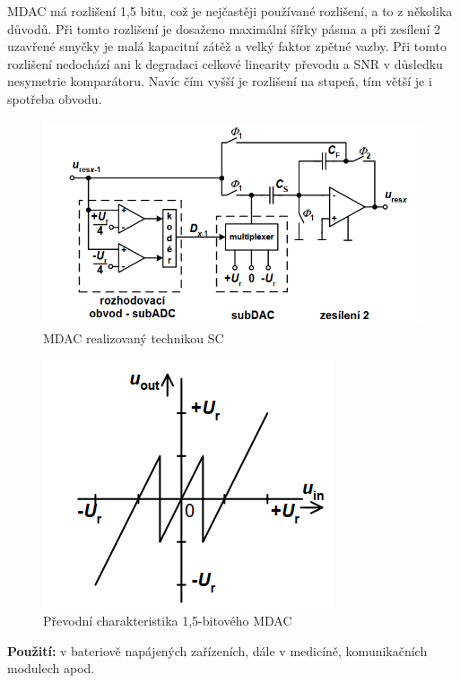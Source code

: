 \pagebreak
MDAC má rozlišení 1,5 bitu, což je nejčastěji používané rozlišení, a to
z několika důvodů. Při tomto rozlišení je dosaženo maximální šířky pásma a při zesílení 2
uzavřené smyčky je malá kapacitní zátěž a velký faktor zpětné vazby. Při tomto rozlišení
nedochází ani k degradaci celkové linearity převodu a SNR v důsledku nesymetrie
komparátoru. Navíc čím vyšší je rozlišení na stupeň, tím větší je i spotřeba obvodu.
\begin{figure}[h]
   \begin{center}
     \includegraphics[scale=0.6]{images/MADC.png}
   \end{center}
   \caption{MDAC realizovaný technikou SC}
\end{figure}
\begin{figure}[h]
   \begin{center}
     \includegraphics[scale=0.6]{images/MADCprev.png}
   \end{center}
   \caption{Převodní charakteristika 1,5-bitového MDAC}
\end{figure}

\pagebreak
\textbf{Použití:} v bateriově napájených zařízeních, dále v medicíně, komunikačních modulech apod.




